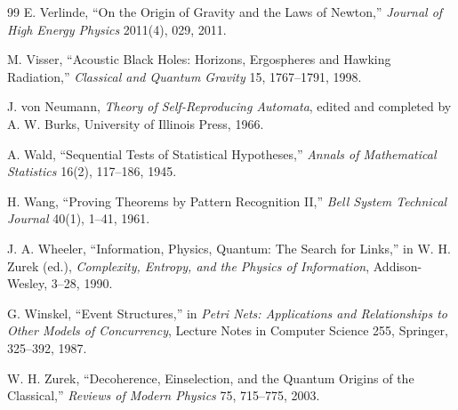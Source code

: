 \documentclass[11pt,twoside,openright]{book}
\theoremstyle{plain}
\theoremstyle{definition}
\theoremstyle{remark}
\begin{document}
\begin{thebibliography}{99}
 E. Verlinde, ``On the Origin of Gravity and the Laws of Newton,'' \emph{Journal of High Energy Physics} 2011(4), 029, 2011.

 M. Visser, ``Acoustic Black Holes: Horizons, Ergospheres and Hawking Radiation,'' \emph{Classical and Quantum Gravity} 15, 1767--1791, 1998.

 J. von Neumann, \emph{Theory of Self-Reproducing Automata}, edited and completed by A. W. Burks, University of Illinois Press, 1966.

 A. Wald, ``Sequential Tests of Statistical Hypotheses,'' \emph{Annals of Mathematical Statistics} 16(2), 117--186, 1945.

 H. Wang, ``Proving Theorems by Pattern Recognition II,'' \emph{Bell System Technical Journal} 40(1), 1--41, 1961.

 J. A. Wheeler, ``Information, Physics, Quantum: The Search for Links,'' in W. H. Zurek (ed.), \emph{Complexity, Entropy, and the Physics of Information}, Addison-Wesley, 3--28, 1990.

 G. Winskel, ``Event Structures,'' in \emph{Petri Nets: Applications and Relationships to Other Models of Concurrency}, Lecture Notes in Computer Science 255, Springer, 325--392, 1987.

 W. H. Zurek, ``Decoherence, Einselection, and the Quantum Origins of the Classical,'' \emph{Reviews of Modern Physics} 75, 715--775, 2003.

\end{thebibliography}
\end{document}
